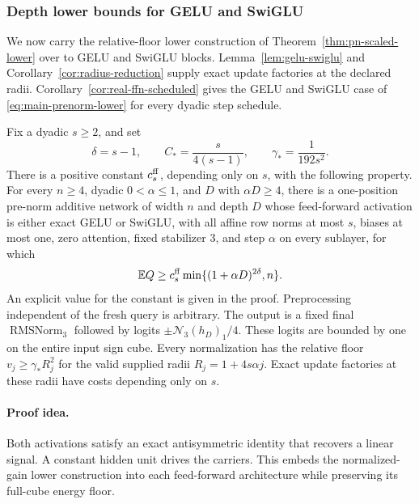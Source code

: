 \subsubsection{Depth lower bounds for GELU and SwiGLU}

We now carry the relative-floor lower construction of
Theorem~\ref{thm:pn-scaled-lower} over to GELU and SwiGLU blocks.
Lemma~\ref{lem:gelu-swiglu} and Corollary~\ref{cor:radius-reduction}
supply exact update factories at the declared radii.
Corollary~\ref{cor:real-ffn-scheduled} gives the GELU and SwiGLU case of
\eqref{eq:main-prenorm-lower} for every dyadic step schedule.

\begin{theorem}
\label{thm:real-ffn-lower}
Fix a dyadic $s\ge2$, and set
\[
 \delta=s-1,\qquad C_* =\frac{s}{4(s-1)},\qquad
 \gamma_* =\frac1{192s^2}.
\]
There is a positive constant $c_s^{\rm ff}$, depending only on $s$,
with the following property.
For every $n\ge4$, dyadic $0<\alpha\le1$, and $D$ with $\alpha D\ge4$,
there is a one-position pre-norm additive network of width $n$ and
depth $D$ whose feed-forward activation is either exact GELU or
SwiGLU, with all affine row norms at most $s$, biases at most one,
zero attention, fixed stabilizer $3$, and step $\alpha$ on every
sublayer, for which
\[
 \mathbb E Q\ge
 c_s^{\rm ff}
 \min\{(1+\alpha D)^{2\delta},n\}.
\]
An explicit value for the constant is given in the proof.
Preprocessing independent of the fresh query is arbitrary. The output
is a fixed final $\operatorname{RMSNorm}_3$ followed by logits
$\pm\mathcal N_3(h_D)_1/4$. These logits are bounded by one on the
entire input sign cube. Every normalization has the relative floor
$v_j\ge\gamma_*R_j^2$ for the valid supplied radii
$R_j=1+4s\alpha j$. Exact update factories at these radii have costs
depending only on $s$.
\end{theorem}
\paragraph{Proof idea.}
Both activations satisfy an exact antisymmetric identity that
recovers a linear signal. A constant hidden unit drives the carriers.
This embeds the normalized-gain lower construction into each feed-forward
architecture while preserving its full-cube energy floor.


